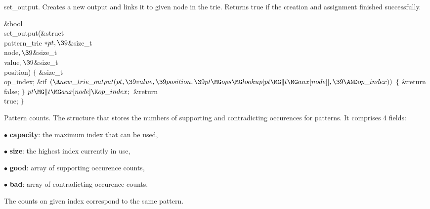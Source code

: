 set\_output.
Creates a new output and links it to given node in the trie. Returns true if
the creation and assignment finished
successfully.

\Y\B\1\1\&{bool} \\{set\_output}(\&{struct} \\{pattern\_trie} ${}{*}\\{pt},%
\39{}$\&{size\_t} \\{node}${},\39{}$\&{size\_t} \\{value}${},\39{}$\&{size\_t} %
\\{position})\2\2\6
${}\{{}$\1\6
\&{size\_t} \\{op\_index};\7
\&{if} ${}(\R\\{new\_trie\_output}(\\{pt},\39\\{value},\39\\{position},\39%
\\{pt}\MG\\{ops}\MG\\{lookup}[\\{pt}\MG\|t\MG\\{aux}[\\{node}]],\39{\AND}\\{op%
\_index})){}$\5
${}\{{}$\1\6
\&{return} \\{false};\6
\4${}\}{}$\2\6
${}\\{pt}\MG\|t\MG\\{aux}[\\{node}]\K\\{op\_index};{}$\6
\&{return} \\{true};\6
\4${}\}{}$\2\par
\fi

Pattern counts.
The structure that stores the numbers of supporting and contradicting
occurences for patterns. It comprises 4 fields:

\item{$\bullet$} {\bf capacity}: the maximum index that can be used,
\item{$\bullet$} {\bf size}: the highest index currently in use,
\item{$\bullet$} {\bf good}: array of supporting occurence counts,
\item{$\bullet$} {\bf bad}: array of contradicting occurence counts.

The counts on given index correspond to the same pattern.

